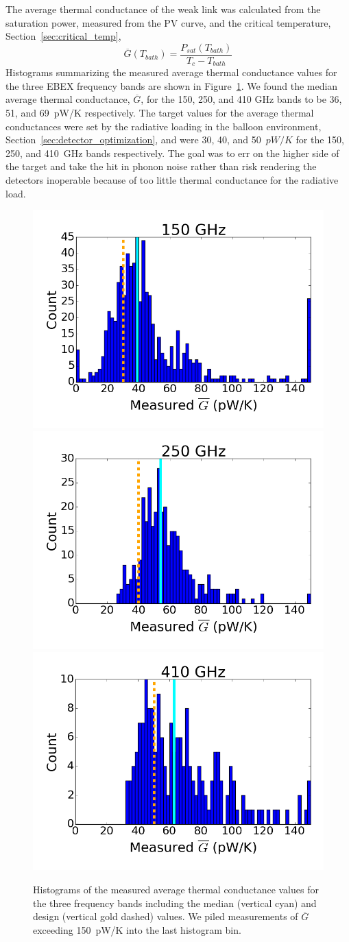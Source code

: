 The average thermal conductance of the weak link was calculated from the saturation power, measured from the PV curve, and the critical temperature, Section~\ref{sec:critical_temp}, 
\begin{equation}
\overline{G}(T_{bath}) = \frac{P_{sat}(T_{bath})}{T_{c} - T_{bath}}
\end{equation}
Histograms summarizing the measured average thermal conductance values for the three \ac{EBEX} frequency bands are shown in Figure~\ref{fig:G_Histograms}.
We found the median average thermal conductance, $\overline{G}$, for the 150, 250, and 410 GHz bands to be 36, 51, and 69~pW/K respectively. 
The target values for the average thermal conductances were set by the radiative loading in the balloon environment, Section~\ref{sec:detector_optimization}, and were 30, 40, and 50~$pW/K$ for the 150, 250, and 410~GHz bands respectively. 
The goal was to err on the higher side of the target and take the hit in phonon noise rather than risk rendering the detectors inoperable because of too little thermal conductance for the radiative load. 

\begin{figure}[ht!]
\centering
\includegraphics[width=0.32\columnwidth]{figures/150_g_bar_hist.png}
\includegraphics[width=0.32\columnwidth]{figures/250_g_bar_hist.png}
\includegraphics[width=0.32\columnwidth]{figures/410_g_bar_hist.png}
\caption{Histograms of the measured average thermal conductance values for the three frequency bands including the 
median (vertical cyan) and design (vertical gold dashed) values. 
We piled measurements of  $\overline{G}$ exceeding 150~pW/K into the last histogram bin.
}
\label{fig:G_Histograms} 
\end{figure}



